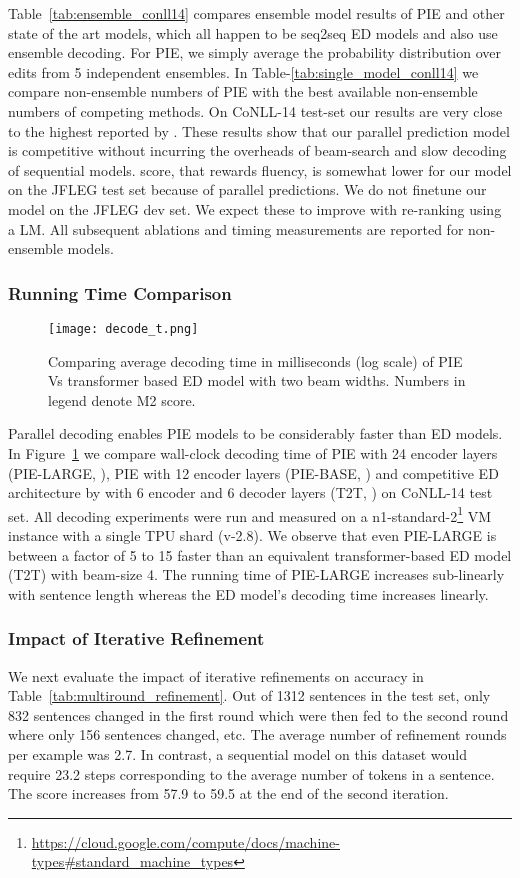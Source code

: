 \documentclass[11pt,a4paper]{article}
\begin{document}
Table~\ref{tab:ensemble_conll14} compares ensemble model results of PIE and other state of the art models, which all happen to be seq2seq ED models and also use ensemble decoding. For PIE, we simply average the probability distribution over edits from 5 independent ensembles. In Table-\ref{tab:single_model_conll14} we compare non-ensemble numbers of PIE with the best available non-ensemble numbers of competing methods.
On CoNLL-14 test-set our results are very close to the highest reported by \citet{zhao2019improving}. These results show that our parallel prediction model is competitive without incurring the overheads of beam-search and slow decoding of sequential models.   score, that rewards fluency, is somewhat lower for our model on the JFLEG test set because of parallel predictions. We do not finetune our model on the JFLEG dev set. We expect these to improve with re-ranking using a LM. 
All subsequent ablations and timing measurements are reported for non-ensemble models.

\subsubsection{Running Time Comparison}

\begin{figure}[h]
    \texttt{[image: decode\_t.png]}
    \caption{Comparing average decoding time in milliseconds (log scale) of PIE Vs transformer based ED model with two beam widths. Numbers in legend denote M2 score.} 
    \label{fig:decodeTime}
\end{figure}


Parallel decoding enables PIE models to be considerably faster than ED models. In Figure~\ref{fig:decodeTime} we compare wall-clock decoding time of PIE with 24 encoder layers (PIE-LARGE, ), PIE with 12 encoder layers (PIE-BASE, ) and competitive ED architecture by \citet{lichtarge2019} with 6 encoder and 6 decoder layers (T2T,  ) on CoNLL-14 test set. All decoding experiments were run and measured on a n1-standard-2\footnote{\url{https://cloud.google.com/compute/docs/machine-types\#standard_machine_types}} VM instance with a single TPU shard (v-2.8). We observe that even PIE-LARGE is between a factor of 5 to 15 faster than an equivalent transformer-based ED model (T2T) with beam-size 4.  The running time of PIE-LARGE increases sub-linearly with sentence length whereas the ED model's decoding time increases linearly.

\subsubsection{Impact of Iterative Refinement}
\label{subsec:iter_ref_impact}
We next evaluate the impact of iterative refinements on accuracy in Table~\ref{tab:multiround_refinement}.
Out of 1312 sentences in the test set, only 832 sentences changed in the first round which were then fed to the second round where only 156 sentences changed, etc. The average number of refinement rounds per example was 2.7.  In contrast, a sequential model on this dataset would require 23.2 steps corresponding to the average number of tokens in a sentence. 
The  score increases from 57.9 to 59.5 at the end of the second iteration. 
\end{document}
